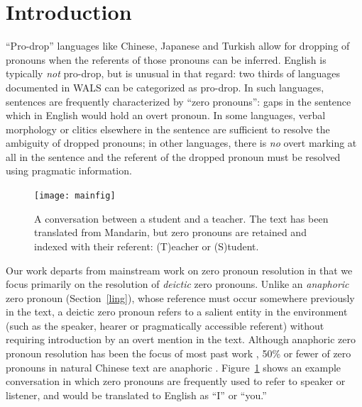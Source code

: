 \documentclass[11pt]{report}
\begin{document}
\section{Introduction}

``Pro-drop'' languages like Chinese, Japanese and Turkish allow for dropping of pronouns when the referents of those pronouns can be inferred. English is typically 
\emph{not} pro-drop, but is unusual in that regard: two thirds of languages documented in WALS \cite{wals} can be categorized as pro-drop. In such languages, sentences are frequently characterized by ``zero pronouns'': gaps in the sentence which in English would hold an overt pronoun. In some languages, verbal morphology or clitics elsewhere in the sentence are sufficient to resolve the ambiguity of dropped pronouns; in other languages, there is \emph{no} overt marking at all in the sentence and the referent of the dropped pronoun must be resolved using pragmatic information.

\begin{figure}[t!]\label{sms-ex}
\centering
\texttt{[image: mainfig]}
\caption{A conversation between a student and a teacher. The text has been translated from Mandarin, but zero pronouns are retained and indexed with their referent: (T)eacher or (S)tudent.}%
\end{figure}

Our work departs from mainstream work on zero pronoun resolution in that we focus primarily on the resolution of \emph{deictic} zero pronouns. Unlike an \emph{anaphoric} zero pronoun (Section~\ref{ling}), whose reference must occur somewhere previously in the text, a deictic zero pronoun refers to a salient entity in the environment (such as the speaker, hearer or pragmatically accessible referent) without requiring introduction by an overt mention in the text. Although anaphoric zero pronoun resolution has been the focus of most past work \cite{yeh2007zero,chenchinese}, 50\% or fewer of zero pronouns in natural Chinese text are anaphoric \cite{zhao2007identification,kong2010tree}. Figure~\ref{sms-ex} shows an example conversation in which zero pronouns are frequently used to refer to speaker or listener, and would be translated to English as ``I'' or ``you.''
\end{document}
